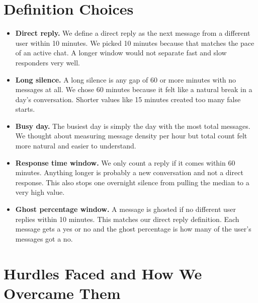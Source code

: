 \documentclass{article}
\begin{document}
\section{Definition Choices}

\begin{itemize}

\item \textbf{Direct reply.} We define a direct reply as the next message from a different user within 10 minutes. We picked 10 minutes because that matches the pace of an active chat. A longer window would not separate fast and slow responders very well.

\item \textbf{Long silence.} A long silence is any gap of 60 or more minutes with no messages at all. We chose 60 minutes because it felt like a natural break in a day's conversation. Shorter values like 15 minutes created too many false starts.

\item \textbf{Busy day.} The busiest day is simply the day with the most total messages. We thought about measuring message density per hour but total count felt more natural and easier to understand.

\item \textbf{Response time window.} We only count a reply if it comes within 60 minutes. Anything longer is probably a new conversation and not a direct response. This also stops one overnight silence from pulling the median to a very high value.

\item \textbf{Ghost percentage window.} A message is ghosted if no different user replies within 10 minutes. This matches our direct reply definition. Each message gets a yes or no and the ghost percentage is how many of the user's messages got a no.

\end{itemize}

\section{Hurdles Faced and How We Overcame Them}
\end{document}
